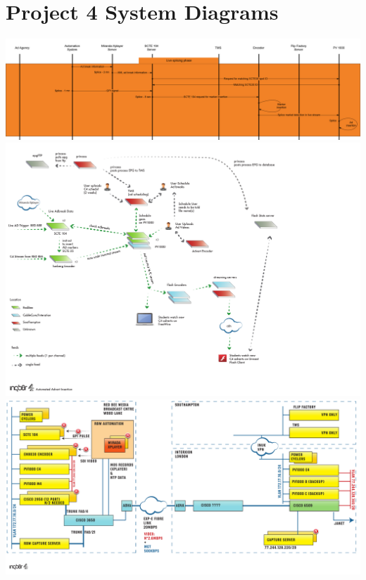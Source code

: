 \section{Project 4 System Diagrams}

\includegraphics[angle=90,scale=0.2]{resources/P4_Event_Flow.png}
\label{Project4EventFlow}
\newpage
\includegraphics[scale=0.35]{resources/P4_System_Overview.pdf}
\label{Project4System}
\newpage
\includegraphics[angle=90,scale=0.55]{resources/P4_Server_Config.pdf}\\
\label{Project4Server}